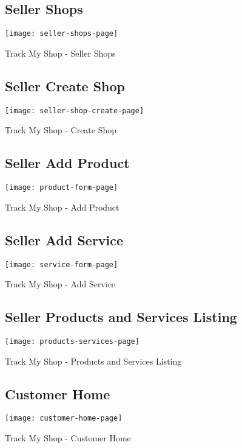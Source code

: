 \begin{figure}[h]
	\subsection{Seller Shops\\}
	\centering
	\texttt{[image: seller-shops-page]}
	\caption{Track My Shop - Seller Shops}
\end{figure}

\vspace{2cm}

\begin{figure}[h]
	\subsection{Seller Create Shop \\}
	\centering
	\texttt{[image: seller-shop-create-page]}
	\caption{Track My Shop - Create Shop}
\end{figure}
\newpage

\begin{figure}[h]
	\subsection{Seller Add Product }
	\centering
	\texttt{[image: product-form-page]}
	\caption{Track My Shop - Add Product}
\end{figure}
\vspace{0.5cm}
\begin{figure}[h]
	\subsection{Seller Add Service \\}
	\centering
	\texttt{[image: service-form-page]}
	\caption{Track My Shop - Add Service}
\end{figure}
\newpage

\begin{figure}[h]
	\subsection{Seller Products and Services Listing}
	\centering
	\texttt{[image: products-services-page]}
	\caption{Track My Shop - Products and Services Listing}
\end{figure}


\begin{figure}[h]
	\subsection{Customer Home \\}
	\centering
	\texttt{[image: customer-home-page]}
	\caption{Track My Shop - Customer Home}
\end{figure}
\newpage

